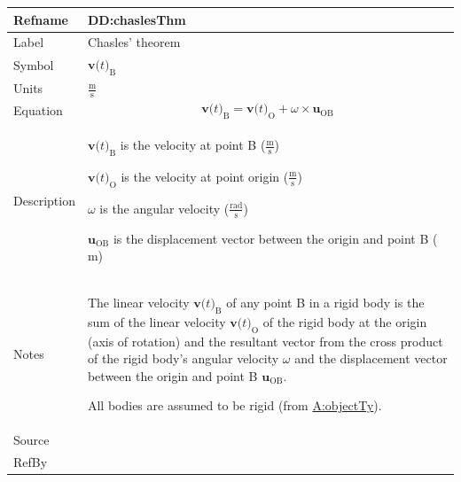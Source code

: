 \documentclass[12pt]{article}
\begin{document}
\vspace{\baselineskip}
\noindent
\begin{minipage}{\textwidth}
\begin{tabular}{>{\raggedright}p{}>{\raggedright\arraybackslash}p{}}
\toprule \textbf{Refname} & \textbf{DD:chaslesThm}
\label{DD:chaslesThm}
\\ \midrule
Label & Chasles' theorem
        
\\ \midrule
Symbol & ${\symbf{v}\text{(}t\text{)}_{\text{B}}}$
         
\\ \midrule
Units & $\frac{\text{m}}{\text{s}}$
        
\\ \midrule
Equation & \begin{displaymath}
           {\symbf{v}\text{(}t\text{)}_{\text{B}}}={\symbf{v}\text{(}t\text{)}_{\text{O}}}+ω\times{\symbf{u}_{\text{O}\text{B}}}
           \end{displaymath}
\\ \midrule
Description & \begin{symbDescription}
              \item{${\symbf{v}\text{(}t\text{)}_{\text{B}}}$ is the velocity at point B ($\frac{\text{m}}{\text{s}}$)}
              \item{${\symbf{v}\text{(}t\text{)}_{\text{O}}}$ is the velocity at point origin ($\frac{\text{m}}{\text{s}}$)}
              \item{$ω$ is the angular velocity ($\frac{\text{rad}}{\text{s}}$)}
              \item{${\symbf{u}_{\text{O}\text{B}}}$ is the displacement vector between the origin and point B (${\text{m}}$)}
              \end{symbDescription}
\\ \midrule
Notes & The linear velocity ${\symbf{v}\text{(}t\text{)}_{\text{B}}}$ of any point B in a rigid body is the sum of the linear velocity ${\symbf{v}\text{(}t\text{)}_{\text{O}}}$ of the rigid body at the origin (axis of rotation) and the resultant vector from the cross product of the rigid body's angular velocity $ω$ and the displacement vector between the origin and point B ${\symbf{u}_{\text{O}\text{B}}}$.
        
        All bodies are assumed to be rigid (from \hyperref[assumpOT]{A:objectTy}).
        
\\ \midrule
Source & \cite{chaslesWiki}
         
\\ \midrule
RefBy & 
\\ \bottomrule
\end{tabular}
\end{minipage}
\end{document}
